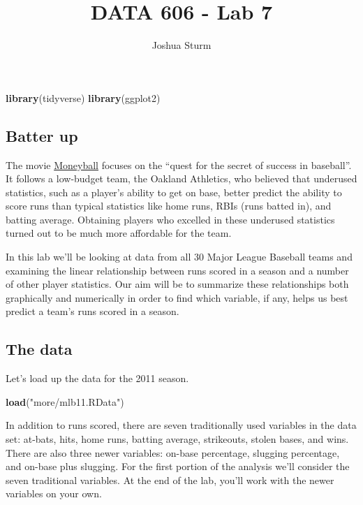 \documentclass[]{article}
\title{DATA 606 - Lab 7}
\author{Joshua Sturm}
\date{}
\newenvironment{Shaded}{\begin{snugshade}}{\end{snugshade}}
\newcommand{\KeywordTok}[1]{\textcolor[rgb]{0.13,0.29,0.53}{\textbf{#1}}}
\newcommand{\StringTok}[1]{\textcolor[rgb]{0.31,0.60,0.02}{#1}}
\newcommand{\NormalTok}[1]{#1}
\begin{document}
\maketitle

\begin{Shaded}
\begin{Highlighting}[]
\KeywordTok{library}\NormalTok{(tidyverse)}
\KeywordTok{library}\NormalTok{(ggplot2)}
\end{Highlighting}
\end{Shaded}

\subsection{Batter up}\label{batter-up}

The movie
\href{http://en.wikipedia.org/wiki/Moneyball_(film)}{Moneyball} focuses
on the ``quest for the secret of success in baseball''. It follows a
low-budget team, the Oakland Athletics, who believed that underused
statistics, such as a player's ability to get on base, better predict
the ability to score runs than typical statistics like home runs, RBIs
(runs batted in), and batting average. Obtaining players who excelled in
these underused statistics turned out to be much more affordable for the
team.

In this lab we'll be looking at data from all 30 Major League Baseball
teams and examining the linear relationship between runs scored in a
season and a number of other player statistics. Our aim will be to
summarize these relationships both graphically and numerically in order
to find which variable, if any, helps us best predict a team's runs
scored in a season.

\subsection{The data}\label{the-data}

Let's load up the data for the 2011 season.

\begin{Shaded}
\begin{Highlighting}[]
\KeywordTok{load}\NormalTok{(}\StringTok{"more/mlb11.RData"}\NormalTok{)}
\end{Highlighting}
\end{Shaded}

In addition to runs scored, there are seven traditionally used variables
in the data set: at-bats, hits, home runs, batting average, strikeouts,
stolen bases, and wins. There are also three newer variables: on-base
percentage, slugging percentage, and on-base plus slugging. For the
first portion of the analysis we'll consider the seven traditional
variables. At the end of the lab, you'll work with the newer variables
on your own.
\end{document}
